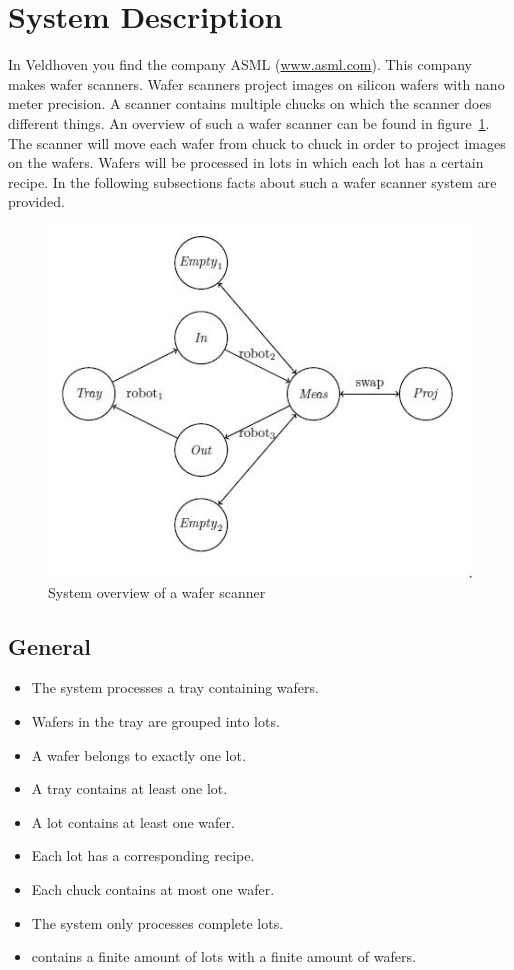 \section{System Description}\label{sec:system_desc}
In Veldhoven you find the company ASML (\url{www.asml.com}).
This company makes wafer scanners.
Wafer scanners project images on silicon wafers with nano meter precision.
A scanner contains multiple chucks on which the scanner does different things.
An overview of such a wafer scanner can be found in figure~\ref{fig:system_overview}.
The scanner will move each wafer from chuck to chuck in order to project images on the wafers.
Wafers will be processed in lots in which each lot has a certain recipe.
In the following subsections facts about such a wafer scanner system are provided.

\begin{figure}[ht!]
    \centering
    \includegraphics{img/SystemOverview.jpg}
    \caption{System overview of a wafer scanner}
    \label{fig:system_overview}
\end{figure}

\subsection{General}
\begin{itemize}
    \item The system processes a tray containing wafers.
    \item Wafers in the tray are grouped into lots.
    \item A wafer belongs to exactly one lot.
    \item A tray contains at least one lot.
    \item A lot contains at least one wafer.
    \item Each lot has a corresponding recipe.
    \item Each chuck contains at most one wafer.
    \item The system only processes complete lots.
    \item \tray contains a finite amount of lots with a finite amount of wafers.
\end{itemize}

